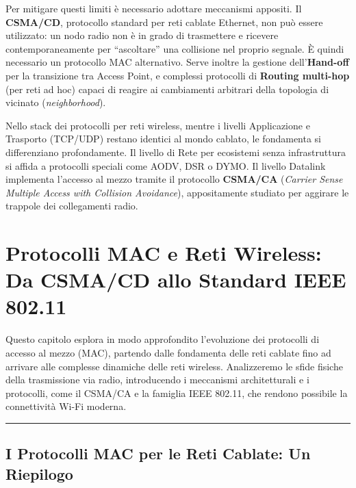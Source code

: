 \documentclass[
  italian,
  openany]{book}
\begin{document}
Per mitigare questi limiti è necessario adottare meccanismi appositi. Il
\textbf{CSMA/CD}, protocollo standard per reti cablate Ethernet, non può
essere utilizzato: un nodo radio non è in grado di trasmettere e
ricevere contemporaneamente per ``ascoltare'' una collisione nel proprio
segnale. È quindi necessario un protocollo MAC alternativo. Serve
inoltre la gestione dell'\textbf{Hand-off} per la transizione tra Access
Point, e complessi protocolli di \textbf{Routing multi-hop} (per reti ad
hoc) capaci di reagire ai cambiamenti arbitrari della topologia di
vicinato (\emph{neighborhood}).

Nello stack dei protocolli per reti wireless, mentre i livelli
Applicazione e Trasporto (TCP/UDP) restano identici al mondo cablato, le
fondamenta si differenziano profondamente. Il livello di Rete per
ecosistemi senza infrastruttura si affida a protocolli speciali come
AODV, DSR o DYMO. Il livello Datalink implementa l'accesso al mezzo
tramite il protocollo \textbf{CSMA/CA} (\emph{Carrier Sense Multiple
Access with Collision Avoidance}), appositamente studiato per aggirare
le trappole dei collegamenti radio.

\newpage

\chapter{Protocolli MAC e Reti Wireless: Da CSMA/CD allo Standard IEEE
802.11}\label{protocolli-mac-e-reti-wireless-da-csmacd-allo-standard-ieee-802.11}

Questo capitolo esplora in modo approfondito l'evoluzione dei protocolli
di accesso al mezzo (MAC), partendo dalle fondamenta delle reti cablate
fino ad arrivare alle complesse dinamiche delle reti wireless.
Analizzeremo le sfide fisiche della trasmissione via radio, introducendo
i meccanismi architetturali e i protocolli, come il CSMA/CA e la
famiglia IEEE 802.11, che rendono possibile la connettività Wi-Fi
moderna.

\begin{center}\rule{0.5\linewidth}{0.5pt}\end{center}

\section{I Protocolli MAC per le Reti Cablate: Un
Riepilogo}\label{i-protocolli-mac-per-le-reti-cablate-un-riepilogo}
\end{document}
